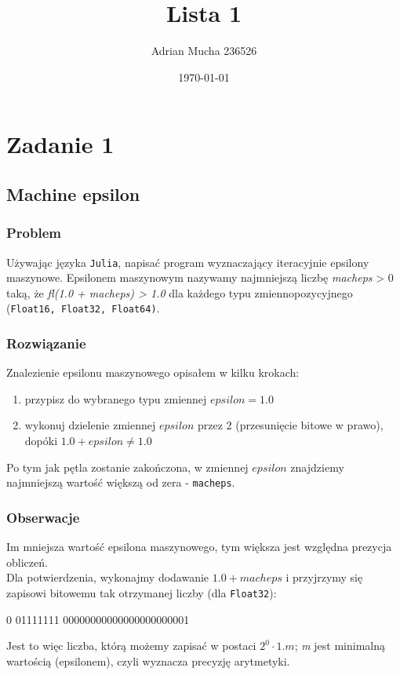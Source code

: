 \documentclass{article}
\title{Lista 1}
\author{Adrian Mucha 236526}
\date{\today}
\begin{document}
\maketitle

\section{Zadanie 1}
    \subsection{Machine epsilon}
    \subsubsection{Problem}
        Używając języka \texttt{Julia}, napisać program wyznaczający iteracyjnie epsilony maszynowe. Epsilonem maszynowym nazywamy najmniejszą liczbę \textit{macheps} > 0 taką, że \textit{fl(1.0 + macheps) > 1.0} dla każdego typu zmiennopozycyjnego (\texttt{Float16, Float32, Float64)}.
    \subsubsection{Rozwiązanie}
        Znalezienie epsilonu maszynowego opisałem w kilku krokach:
        \begin{enumerate}
            \item przypisz do wybranego typu zmiennej $epsilon = 1.0$
            \item wykonuj dzielenie zmiennej $epsilon$ przez 2 (przesunięcie bitowe w prawo), dopóki $1.0 + epsilon \neq 1.0$
        \end{enumerate}
        Po tym jak pętla zostanie zakończona, w zmiennej $epsilon$ znajdziemy najmniejszą wartość większą od zera - \texttt{macheps}. \\
    \subsubsection{Obserwacje}
        Im mniejsza wartość epsilona maszynowego, tym większa jest względna prezycja obliczeń. \\
        Dla potwierdzenia, wykonajmy dodawanie $1.0 + macheps$ i przyjrzymy się zapisowi bitowemu tak otrzymanej liczby (dla \texttt{Float32}):
        \begin{center}
            0 01111111 00000000000000000000001
        \end{center}
        Jest to więc liczba, którą możemy zapisać w postaci $2^{0} \cdot 1.m$; \textit{m} jest minimalną wartością (epsilonem), czyli wyznacza precyzję arytmetyki.
\end{document}

